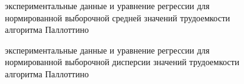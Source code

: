 \documentclass[a4paper,fontsize=14pt]{article}
\begin{document}
\begin{figure}[!]
	\caption{экспериментальные данные и уравнение регрессии для нормированной выборочной средней значений трудоемкости алгоритма Паллоттино}
	\label{fig:regression_mean}
\end{figure}

\begin{figure}[!]
	\caption{экспериментальные данные и уравнение регрессии для нормированной выборочной дисперсии значений трудоемкости алгоритма Паллоттино}
	\label{fig:regression_variance}
\end{figure}
\end{document}
